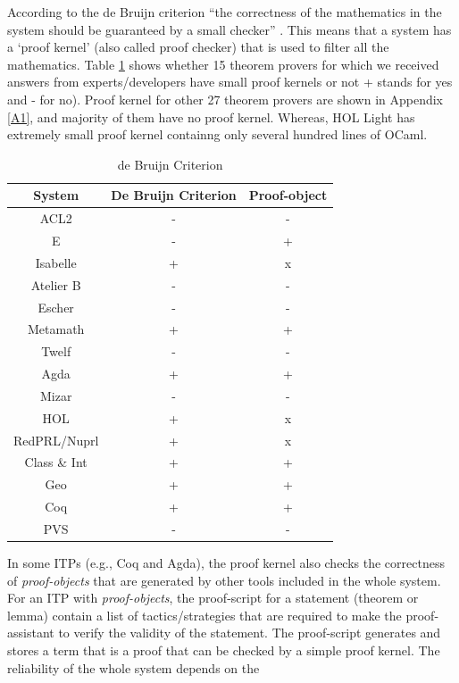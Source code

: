 According to the de Bruijn criterion ``the correctness of the mathematics in the system should be guaranteed by a small checker'' .
This means that a system has a `proof kernel' (also called proof checker) that is used to filter all the mathematics. 
Table \ref{spk} shows whether 15 theorem provers for which we received answers from experts/developers have small proof kernels or not 
+ stands for yes and - for no). Proof kernel for other 27 theorem provers are shown in Appendix \ref{A1}, and majority of them have no proof kernel. 
Whereas, HOL Light has extremely small proof kernel containng only several hundred lines of OCaml. 
\begin{table}[!ht]
 \centering
 \caption{de Bruijn Criterion}\label{spk}\vspace*{-2mm}
  \begin{tabular}{|c|c|c|}
    \hline
    {\bf System} & {\bf De Bruijn Criterion} & {\bf Proof-object} \\ \hline
     ACL2 & - & - \\\hline
     E & - & + \\\hline
     Isabelle & + & x \\\hline
     Atelier B & - & - \\\hline
     Escher & - & - \\\hline
     Metamath & + & + \\\hline
     Twelf & - & - \\\hline
     Agda & + & + \\\hline
     Mizar & - & - \\\hline
     HOL & + & x \\\hline
     RedPRL/Nuprl & + & x \\\hline
     Class \& Int & + & +\\\hline
     Geo & + & + \\\hline
     Coq & + & + \\\hline
     PVS  & - & - \\\hline
     \end{tabular}
\end{table}
In some ITPs (e.g., Coq and Agda), 
the proof kernel also checks the correctness of {\em proof-objects} that are generated by other tools included in the whole system. 
For an ITP with {\em proof-objects}, the proof-script for a statement (theorem or lemma) contain a list of tactics/strategies that are required to make the 
proof-assistant to verify the validity of the statement. The proof-script generates and stores
a term that is a proof that can be checked by a simple proof kernel. The reliability of the whole system depends on the
